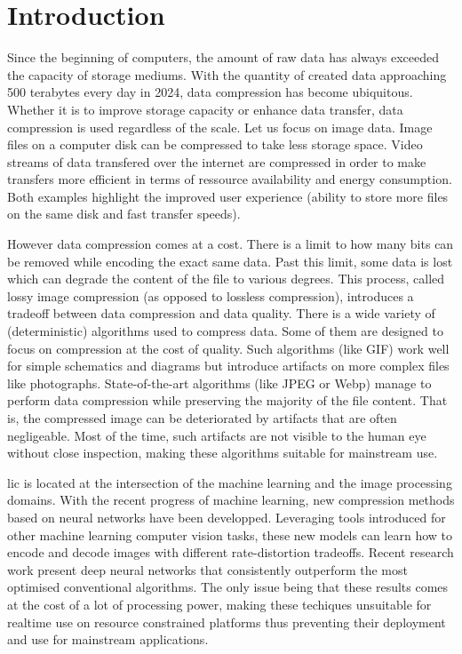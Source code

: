 \chapter*{Introduction}
Since the beginning of computers, the amount of raw data has always exceeded the capacity of storage mediums. With the quantity of created data approaching 500 terabytes every day in 2024, data compression has become ubiquitous. Whether it is to improve storage capacity or enhance data transfer, data compression is used regardless of the scale. Let us focus on image data. Image files on a computer disk can be compressed to take less storage space. Video streams of data transfered over the internet are compressed in order to make transfers more efficient in terms of ressource availability and energy consumption. Both examples highlight the improved user experience (ability to store more files on the same disk and fast transfer speeds).

However data compression comes at a cost. There is a limit to how many bits can be removed while encoding the exact same data. Past this limit, some data is lost which can degrade the content of the file to various degrees. This process, called lossy image compression (as opposed to lossless compression), introduces a tradeoff between data compression and data quality. There is a wide variety of (deterministic) algorithms used to compress data. Some of them are designed to focus on compression at the cost of quality. Such algorithms (like GIF) work well for simple schematics and diagrams but introduce artifacts on more complex files like photographs. State-of-the-art algorithms (like JPEG or Webp) manage to perform data compression while preserving the majority of the file content. That is, the compressed image can be deteriorated by artifacts that are often negligeable. Most of the time, such artifacts are not visible to the human eye without close inspection, making these algorithms suitable for mainstream use.

\acrfull{lic} is located at the intersection of the machine learning and the image processing domains. With the recent progress of machine learning, new compression methods based on neural networks have been developped. Leveraging tools introduced for other machine learning computer vision tasks, these new models can learn how to encode and decode images with different rate-distortion tradeoffs. Recent research work present deep neural networks that consistently outperform the most optimised conventional algorithms. The only issue being that these results comes at the cost of a lot of processing power, making these techiques unsuitable for realtime use on resource constrained platforms thus preventing their deployment and use for mainstream applications.

